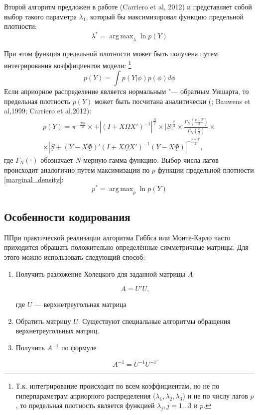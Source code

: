 \documentclass[11pt]{article} %
\DeclareMathOperator*{\argmax}{arg\,max}
\newcommand{\prior}{\underline}
\begin{document}
Второй алгоритм предложен в работе (Carriero et al, 2012) и представляет собой выбор такого параметра $\lambda_1$, который бы максимизировал функцию предельной плотности:
\begin{equation}
\lambda^*=\argmax_{\lambda} \ln p(Y)
\end{equation}

При этом функция предельной плотности может быть получена путем интегрирования коэффициентов модели: \footnote{Т.к. интегрирование происходит по  всем коэффициентам, но не по гиперпараметрам априорного распределения ($\lambda_1,\lambda_2,\lambda_3$)  и не по числу лагов $p$, то предельная плотность является функцией $\lambda_j,j=1\ldots 3$ и $p$.}
\begin{equation}
p(Y)=\int p(Y|\phi)p(\phi) d \phi
\end{equation}
Если априорное распределение является нормальным "--- обратным Уишарта, то предельная плотность $p(Y)$ может быть посчитана аналитически (\cite{zellner_1996_introduction}; Bauwens et al,1999; Carriero et al,2012):
\begin{multline}
p(Y)=\pi^{-\frac{Tm}{2}}\times +\left |(I+X\prior{\Omega} X')^{-1}\right|^{\frac{N}{2}}\times |\prior{S}|^{\frac{\prior{\nu}}{2}}\times \frac{\Gamma_N(\frac{\prior{\nu}+T}{2})}{\Gamma_N(\frac{\prior{\nu}}{2})}\times \\ \times
\left|\prior{S}+(Y-X\prior{\Phi})'(I+X\prior{\Omega} X')^{-1}(Y-X\prior{\Phi})\right|^{-\frac{\prior{\nu}+T}{2}},\label{marginal_density}
\end{multline}
где $\Gamma_N(\cdot)$ обозначает $N$-мерную гамма функцию.
Выбор числа лагов происходит аналогично путем максимизации по $p$ функции предельной плотности \eqref{marginal_density}: 
\begin{equation}
p^*=\argmax_{p} \ln p(Y)
\end{equation} 


\subsection{Особенности кодирования}

ППри практической реализации алгоритма Гиббса или Монте-Карло часто
приходится обращать положительно определённые симметричные матрицы.
Для этого можно использовать следующий способ:


\begin{enumerate}

\item Получить разложение Холецкого для заданной матрицы $A$

\[
A=U'U,
\]

где $U$ --- верхнетреугольная матрица

\item Обратить матрицу $U$. Существуют специальные алгоритмы обращения
верхнетреугольных матриц.

\item Получить $A^{-1}$ по формуле

\[
A^{-1}=U^{-1}U^{-1\prime}
\]

\end{enumerate}
\end{document}
